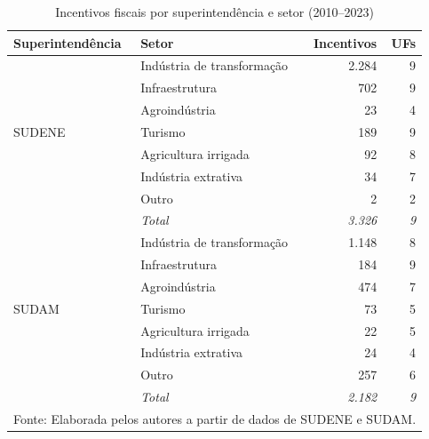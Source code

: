 \begin{table}[htbp]
	\centering
	\caption{Incentivos fiscais por superintendência e setor (2010--2023)}
	\label{tab:resumo_if}
	\footnotesize
	\renewcommand{\arraystretch}{1.2}
	\begin{tabular}{llrr}
		\toprule
		Superintendência & Setor & Incentivos & UFs \\
		\midrule
		\multirow{7}{*}{SUDENE} & Indústria de transformação & 2.284 & 9 \\
		 & Infraestrutura & 702 & 9 \\
		 & Agroindústria & 23 & 4 \\
		 & Turismo & 189 & 9 \\
		 & Agricultura irrigada & 92 & 8 \\
		 & Indústria extrativa & 34 & 7 \\
		 & Outro & 2 & 2 \\
		& \textit{Total} & \textit{3.326} & \textit{9} \\
		\midrule
		\multirow{7}{*}{SUDAM} & Indústria de transformação & 1.148 & 8 \\
		 & Infraestrutura & 184 & 9 \\
		 & Agroindústria & 474 & 7 \\
		 & Turismo & 73 & 5 \\
		 & Agricultura irrigada & 22 & 5 \\
		 & Indústria extrativa & 24 & 4 \\
		 & Outro & 257 & 6 \\
		& \textit{Total} & \textit{2.182} & \textit{9} \\
		\bottomrule
		\multicolumn{4}{l}{\footnotesize Fonte: Elaborada pelos autores a partir de dados de SUDENE e SUDAM.} \\
	\end{tabular}
\end{table}